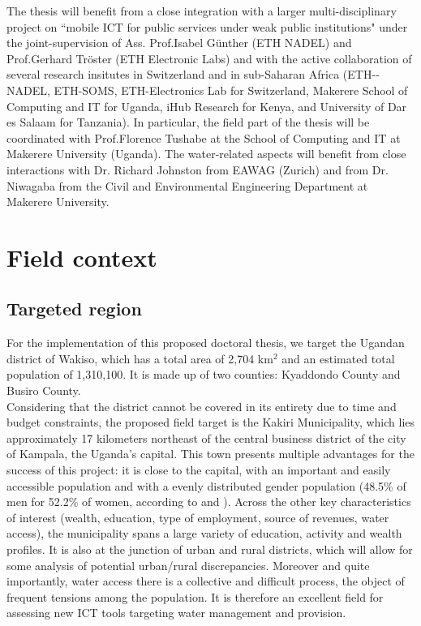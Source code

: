 \documentclass[11pt]{article}
\begin{document}
The thesis will benefit from a close integration with a larger multi-disciplinary project on ``mobile ICT for public services under weak public institutions" under the joint-supervision of Ass. Prof.Isabel G\"{u}nther (ETH NADEL) and Prof.Gerhard Tr\"{o}ster (ETH Electronic Labs) and with the active collaboration of several research insitutes in Switzerland and in sub-Saharan Africa (ETH-­NADEL, ETH-­SOMS, ETH-­Electronics Lab for Switzerland, Makerere School of Computing and IT for Uganda, iHub Research for Kenya, and University of Dar es Salaam for Tanzania). In particular, the field part of the thesis will be coordinated with Prof.Florence Tushabe at the School of Computing and IT at Makerere University (Uganda). The water-related aspects will benefit from close interactions with Dr. Richard Johnston from EAWAG (Zurich) and from Dr. Niwagaba from the Civil and Environmental Engineering Department at Makerere University.  

\section{Field context}
\subsection{Targeted region}
For the implementation of this proposed doctoral thesis, we target the Ugandan district of Wakiso, which has a total area of 2,704 km$^{2}$ and an estimated total population of 1,310,100. It is made up of two counties: Kyaddondo County and Busiro County. 
\\
Considering that the district cannot be covered in its entirety due to time and budget constraints, the proposed field target is the Kakiri Municipality, which lies approximately 17 kilometers northeast of the central business district of the city of Kampala, the Uganda's capital. This town presents multiple advantages for the success of this project: it is close to the capital, with an important and easily accessible population and with a evenly distributed gender population (48.5\% of men for 52.2\% of women, according to \citep{population2010} and \citep{population02}). Across the other key characteristics of interest (wealth, education, type of employment, source of revenues, water access), the municipality spans a large variety of education, activity and wealth profiles. It is also at the junction of urban and rural districts, which will allow for some analysis of potential urban/rural discrepancies. Moreover and quite importantly, water access there is a collective and difficult process, the object of 
frequent tensions among the population. It is therefore an excellent field for assessing new ICT tools targeting water management and provision.
\end{document}

